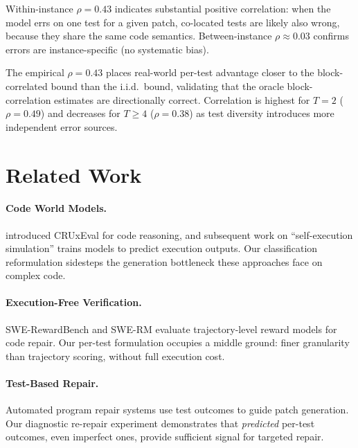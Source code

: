 \documentclass[11pt,a4paper]{article}
\begin{document}
Within-instance $\rho{=}0.43$ indicates substantial positive correlation: when the model errs on one test for a given patch, co-located tests are likely also wrong, because they share the same code semantics.
Between-instance $\rho{\approx}0.03$ confirms errors are instance-specific (no systematic bias).

The empirical $\rho{=}0.43$ places real-world per-test advantage closer to the block-correlated bound than the i.i.d.\ bound, validating that the oracle block-correlation estimates are directionally correct.
Correlation is highest for $T{=}2$ ($\rho{=}0.49$) and decreases for $T{\geq}4$ ($\rho{=}0.38$) as test diversity introduces more independent error sources.

\section{Related Work}

\paragraph{Code World Models.} \citet{gu2024cruxeval} introduced CRUxEval for code reasoning, and subsequent work on ``self-execution simulation'' trains models to predict execution outputs.
Our classification reformulation sidesteps the generation bottleneck these approaches face on complex code.

\paragraph{Execution-Free Verification.} SWE-RewardBench and SWE-RM evaluate trajectory-level reward models for code repair.
Our per-test formulation occupies a middle ground: finer granularity than trajectory scoring, without full execution cost.

\paragraph{Test-Based Repair.} Automated program repair systems use test outcomes to guide patch generation.
Our diagnostic re-repair experiment demonstrates that \emph{predicted} per-test outcomes, even imperfect ones, provide sufficient signal for targeted repair.

\end{document}
